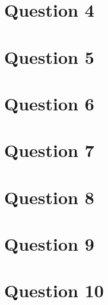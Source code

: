 \documentclass[12pt]{article}
\begin{document}
\section*{Question 4}

\section*{Question 5}

\section*{Question 6}

\section*{Question 7}

\section*{Question 8}

\section*{Question 9}

\section*{Question 10}
\end{document}
